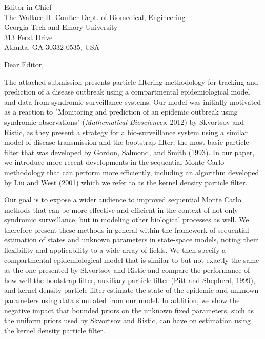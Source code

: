 \documentclass{letter} %
\begin{document}
\signature{Daniel M. Sheinson, Jarad Niemi, and Wendy Meiring}           %
\longindentation=0pt                       %
\let\raggedleft\raggedright                %

\begin{letter}{Editor-in-Chief \\
The Wallace H. Coulter Dept. of Biomedical, Engineering \\
Georgia Tech and Emory University \\
313 Ferst Drive \\
Atlanta, GA 30332-0535, USA
}

\opening{Dear Editor,}

\noindent The attached submission presents particle filtering methodology for tracking and prediction of a disease outbreak using a compartmental epidemiological model and data from syndromic surveillance systems. Our model was initially motivated as a reaction to "Monitoring and prediction of an epidemic outbreak using syndromic observations" (\emph{Mathematical Biosciences}, 2012) by Skvortsov and Ristic, as they present a strategy for a bio-surveillance system using a similar model of disease transmission and the bootstrap filter, the most basic particle filter that was developed by Gordon, Salmond, and Smith (1993). In our paper, we introduce more recent developments in the sequential Monte Carlo methodology that can perform more efficiently, including an algorithm developed by Liu and West (2001) which we refer to as the kernel density particle filter.

Our goal is to expose a wider audience to improved sequential Monte Carlo methods that can be more effective and efficient in the context of not only syndromic surveillance, but in modeling other biological processes as well. We therefore present these methods in general within the framework of sequential estimation of states and unknown parameters in state-space models, noting their flexibility and applicability to a wide array of fields. We then specify a compartmental epidemiological model that is similar to but not exactly the same as the one presented by Skvortsov and Ristic and compare the performance of how well the bootstrap filter, auxiliary particle filter (Pitt and Shepherd, 1999), and kernel density particle filter estimate the state of the epidemic and unknown parameters using data simulated from our model. In addition, we show the negative impact that bounded priors on the unknown fixed parameters, such as the uniform priors used by Skvortsov and Ristic, can have on estimation using the kernel density particle filter.


\end{letter}
\end{document}
